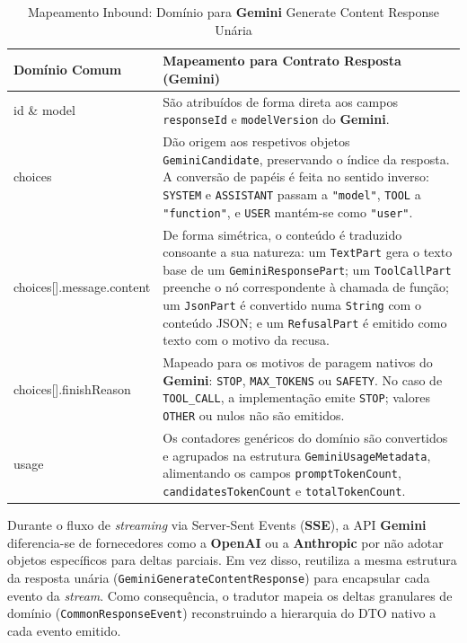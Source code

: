 \begin{table}[H]
    \centering
    \footnotesize
    \renewcommand{\arraystretch}{1.25}
    \begin{tabularx}{\textwidth}{|>{\ttfamily\raggedright\arraybackslash}p{4cm}|Y|}
        \hline
        \textbf{Domínio Comum} & \textbf{Mapeamento para Contrato Resposta (Gemini)} \\
        \hline
        id \& model & São atribuídos de forma direta aos campos \texttt{responseId} e \texttt{modelVersion} do \textbf{Gemini}. \\
        \hline
        choices & Dão origem aos respetivos objetos \texttt{GeminiCandidate}, preservando o índice da resposta. A conversão de papéis é feita no sentido inverso: \texttt{SYSTEM} e \texttt{ASSISTANT} passam a \texttt{"model"}, \texttt{TOOL} a \texttt{"function"}, e \texttt{USER} mantém-se como \texttt{"user"}. \\
        \hline
        choices[].message\newline.content & De forma simétrica, o conteúdo é traduzido consoante a sua natureza: um \texttt{TextPart} gera o texto base de um \texttt{GeminiResponsePart}; um \texttt{ToolCallPart} preenche o nó correspondente à chamada de função; um \texttt{JsonPart} é convertido numa \texttt{String} com o conteúdo JSON; e um \texttt{RefusalPart} é emitido como texto com o motivo da recusa. \\
        \hline
        choices[].finishReason & Mapeado para os motivos de paragem nativos do \textbf{Gemini}: \texttt{STOP}, \texttt{MAX\_TOKENS} ou \texttt{SAFETY}. No caso de \texttt{TOOL\_CALL}, a implementação emite \texttt{STOP}; valores \texttt{OTHER} ou nulos não são emitidos. \\
        \hline
        usage & Os contadores genéricos do domínio são convertidos e agrupados na estrutura \texttt{GeminiUsageMetadata}, alimentando os campos \texttt{promptTokenCount}, \texttt{candidatesTokenCount} e \texttt{totalTokenCount}. \\
        \hline
    \end{tabularx}
    \caption{Mapeamento Inbound: Domínio para \textbf{Gemini} Generate Content Response Unária}
\end{table}

    Durante o fluxo de \textit{streaming} via Server-Sent Events (\textbf{SSE}), a API \textbf{Gemini} diferencia-se de fornecedores como a \textbf{OpenAI} ou a \textbf{Anthropic} por não adotar objetos específicos para deltas parciais. Em vez disso, reutiliza a mesma estrutura da resposta unária (\texttt{Gemini\allowbreak{}Generate\allowbreak{}Content\allowbreak{}Response}) para encapsular cada evento da \textit{stream}. Como consequência, o tradutor mapeia os deltas granulares de domínio (\texttt{CommonResponseEvent}) reconstruindo a hierarquia do DTO nativo a cada evento emitido.

